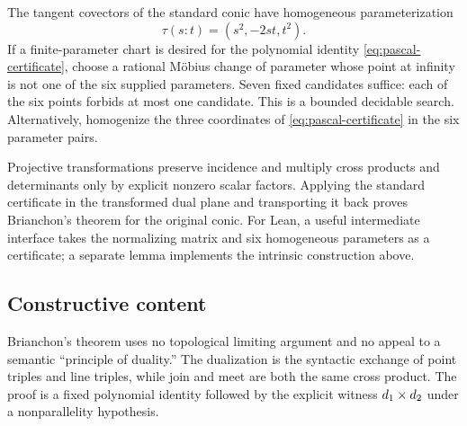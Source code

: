 The tangent covectors of the standard conic have homogeneous parameterization
\[
 \tau(s:t)=(s^2,-2st,t^2).
\]
If a finite-parameter chart is desired for the polynomial identity
\eqref{eq:pascal-certificate}, choose a rational M\"obius change of parameter
whose point at infinity is not one of the six supplied parameters.  Seven
fixed candidates suffice: each of the six points forbids at most one
candidate.  This is a bounded decidable search.  Alternatively, homogenize
the three coordinates of \eqref{eq:pascal-certificate} in the six parameter
pairs.

Projective transformations preserve incidence and multiply cross products and
determinants only by explicit nonzero scalar factors.  Applying the standard
certificate in the transformed dual plane and transporting it back proves
Brianchon's theorem for the original conic.  For Lean, a useful intermediate
interface takes the normalizing matrix and six homogeneous parameters as a
certificate; a separate lemma implements the intrinsic construction above.

\subsection{Constructive content}

Brianchon's theorem uses no topological limiting argument and no appeal to a
semantic ``principle of duality.''  The dualization is the syntactic exchange
of point triples and line triples, while join and meet are both the same cross
product.  The proof is a fixed polynomial identity followed by the explicit
witness $d_1\mathbin{\times} d_2$ under a nonparallelity hypothesis.
